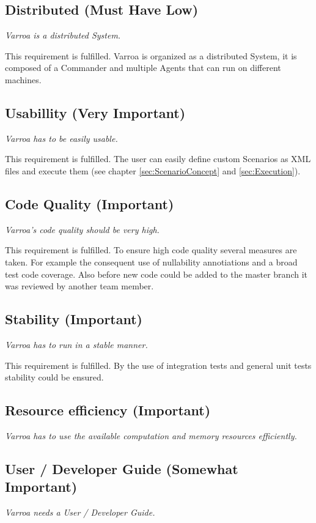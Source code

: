 \subsection{Distributed (Must Have Low)} 
\emph{Varroa is a distributed System.}

This requirement is fulfilled.
Varroa is organized as a distributed System, it is composed of a Commander and multiple Agents that can run on different machines. 
 
\subsection{Usabillity (Very Important)} 
\emph{Varroa has to be easily usable.}

This requirement is fulfilled.
The user can easily define custom Scenarios as XML files and execute them (see chapter \ref{sec:ScenarioConcept} and \ref{sec:Execution}).

\subsection{Code Quality (Important)} 
\emph{Varroa's code quality should be very high.}

This requirement is fulfilled.
To ensure high code quality several measures are taken.
For example the consequent use of nullability annotiations and a broad test code coverage.
Also before new code could be added to the master branch it was reviewed by another team member.

\subsection{Stability (Important)} 
\emph{Varroa has to run in a stable manner.}

This requirement is fulfilled.
By the use of integration tests and general unit tests stability could be ensured.

\subsection{Resource efficiency (Important)} 
\emph{Varroa has to use the available computation and memory resources efficiently.}

\subsection{User / Developer Guide (Somewhat Important)} 
\emph{Varroa needs a User / Developer Guide.}

